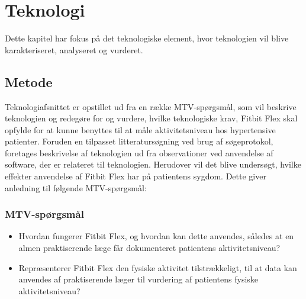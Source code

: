 \chapter{Teknologi}
Dette kapitel har fokus på det teknologiske element, hvor teknologien vil blive karakteriseret, analyseret og vurderet.
\section{Metode}
Teknologiafsnittet er opstillet ud fra en række MTV-spørgsmål, som vil beskrive teknologien og redegøre for og vurdere, hvilke teknologiske krav, Fitbit Flex skal opfylde for at kunne benyttes til at måle aktivitetsniveau hos hypertensive patienter. 
 Foruden en tilpasset litteratursøgning ved brug af søgeprotokol, foretages beskrivelse af teknologien ud fra observationer ved anvendelse af software, der er relateret til teknologien.   
Herudover vil det blive undersøgt, hvilke effekter anvendelse af Fitbit Flex har på patientens sygdom. 
Dette giver anledning til følgende MTV-spørgsmål: 
\subsection{MTV-spørgsmål}
\begin{itemize}
\item Hvordan fungerer Fitbit Flex, og hvordan kan dette anvendes, således at en almen praktiserende læge får dokumenteret patientens aktivitetsniveau?
\item Repræsenterer Fitbit Flex den fysiske aktivitet tilstrækkeligt, til at data kan anvendes af praktiserende læger til vurdering af patientens fysiske aktivitetsniveau?
\end{itemize}








